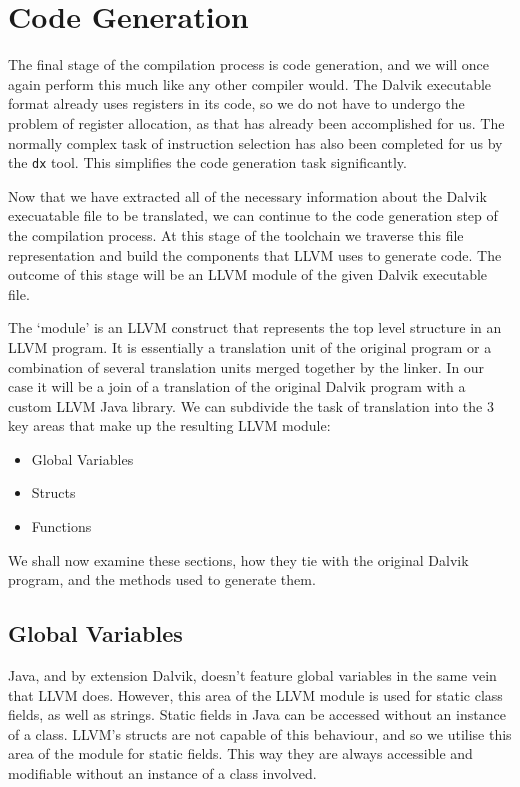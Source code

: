 \section{Code Generation}
\label{sec:codegen}

The final stage of the compilation process is code generation, and we will once again perform this much like any other compiler would. The Dalvik executable format already uses registers in its code, so we do not have to undergo the problem of register allocation, as that has already been accomplished for us. The normally complex task of instruction selection has also been completed for us by the \verb|dx| tool. This simplifies the code generation task significantly.

Now that we have extracted all of the necessary information about the Dalvik execuatable file to be translated, we can continue to the code generation step of the compilation process. At this stage of the toolchain we traverse this file representation and build the components that LLVM uses to generate code. The outcome of this stage will be an LLVM module of the given Dalvik executable file.

The `module' is an LLVM construct that represents the top level structure in an LLVM program. It is essentially a translation unit of the original program or a combination of several translation units merged together by the linker. In our case it will be a join of a translation of the original Dalvik program with a custom LLVM Java library. We can subdivide the task of translation into the 3 key areas that make up the resulting LLVM module:

\begin{itemize}
	\item Global Variables
	\item Structs
	\item Functions
\end{itemize}

We shall now examine these sections, how they tie with the original Dalvik program, and the methods used to generate them.

\subsection*{Global Variables}

Java, and by extension Dalvik, doesn't feature global variables in the same vein that LLVM does. However, this area of the LLVM module is used for static class fields, as well as strings. Static fields in Java can be accessed without an instance of a class. LLVM's structs are not capable of this behaviour, and so we utilise this area of the module for static fields. This way they are always accessible and modifiable without an instance of a class involved.

